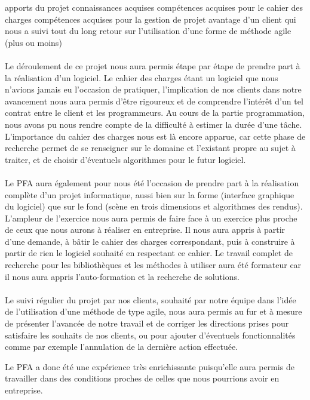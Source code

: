 apports du projet
connaissances acquises
compétences acquises pour le cahier des charges
compétences acquises pour la gestion de projet
avantage d'un client qui nous a suivi tout du long
retour sur l'utilisation d'une forme de méthode agile (plus ou moins)


\paragraph{}
Le déroulement de ce projet nous aura permis étape par étape de prendre part à la réalisation d'un logiciel. Le cahier des charges étant un logiciel que nous n'avions jamais eu l'occasion de pratiquer, l'implication de nos clients dans notre avancement nous aura permis d'être rigoureux et de comprendre l'intérêt d'un tel contrat entre le client et les programmeurs.
Au cours de la partie programmation, nous avons pu nous rendre compte de la difficulté à estimer la durée d'une tâche. L'importance du cahier des charges nous est là encore apparue, car cette phase de recherche permet de se renseigner sur le domaine et l'existant propre au sujet à traiter, et de choisir d'éventuels algorithmes pour le futur logiciel.

\paragraph{}
Le PFA aura également pour nous été l'occasion de prendre part à la réalisation complète d'un projet informatique, aussi bien sur la forme (interface graphique du logiciel) que sur le fond (scène en trois dimensions et algorithmes des rendus). L'ampleur de l'exercice nous aura permis de faire face à un exercice plus proche de ceux que nous aurons à réaliser en entreprise. Il nous aura appris à partir d'une demande, à bâtir le cahier des charges correspondant, puis à construire à partir de rien le logiciel souhaité en respectant ce cahier. Le travail complet de recherche pour les bibliothèques et les méthodes à utiliser aura été formateur car il nous aura appris l'auto-formation et la recherche de solutions.

\paragraph{}
Le suivi régulier du projet par nos clients, souhaité par notre équipe dans l'idée de l'utilisation d'une méthode de type agile, nous aura permis au fur et à mesure de présenter l'avancée de notre travail et de corriger les directions prises pour satisfaire les souhaits de nos clients, ou pour ajouter d'éventuels fonctionnalités comme par exemple l'annulation de la dernière action effectuée.

\paragrap{}
Le PFA a donc été une expérience très enrichissante puisqu'elle aura permis de travailler dans des conditions proches de celles que nous pourrions avoir en entreprise.
